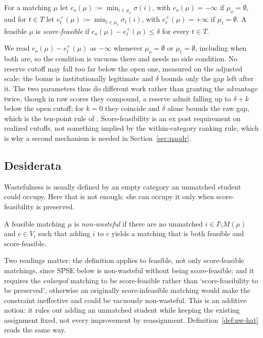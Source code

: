 \documentclass[runningheads]{llncs}
\begin{document}
\begin{definition}
\label{def:scorefeas}
For a matching $\mu$ let $e_o(\mu):=\min_{i\in\mu_o}\sigma(i)$, with $e_o(\mu)=-\infty$ if $\mu_o=\emptyset$, and for $t\in T$ let $e_t^+(\mu):=\min_{i\in\mu_t}\sigma_t(i)$, with $e_t^+(\mu)=+\infty$ if $\mu_t=\emptyset$. A feasible $\mu$ is \emph{score-feasible} if $e_o(\mu)-e_t^+(\mu)\le\delta$ for every $t\in T$.
\end{definition}

We read $e_o(\mu)-e_t^+(\mu)$ as $-\infty$ whenever $\mu_o=\emptyset$ or $\mu_t=\emptyset$, including when both are, so the condition is vacuous there and needs no side condition. No reserve cutoff may fall too far below the open one, measured on the adjusted scale: the bonus is institutionally legitimate and $\delta$ bounds only the gap left after it. The two parameters thus do different work rather than granting the advantage twice, though in raw scores they compound, a reserve admit falling up to $\delta+k$ below the open cutoff; for $k=0$ they coincide and $\delta$ alone bounds the raw gap, which is the ten-point rule of \cite{AyTu23b}. Score-feasibility is an ex post requirement on realized cutoffs, not something implied by the within-category ranking rule, which is why a second mechanism is needed in Section~\ref{sec:paodr}.

\subsection{Desiderata}

Wastefulness is usually defined by an empty category an unmatched student could occupy. Here that is not enough: she can occupy it only when score-feasibility is preserved.

\begin{definition}
\label{def:nw}
A feasible matching $\mu$ is \emph{non-wasteful} if there are no unmatched $i\in I\setminus M(\mu)$ and $c\in V_i$ such that adding $i$ to $c$ yields a matching that is both feasible and score-feasible.
\end{definition}

Two readings matter: the definition applies to feasible, not only score-feasible matchings, since SPSE below is non-wasteful without being score-feasible; and it requires the \emph{enlarged} matching to be score-feasible rather than `score-feasibility to be preserved', otherwise an originally score-infeasible matching would make the constraint ineffective and could be vacuously non-wasteful. This is an additive notion: it rules out adding an unmatched student while keeping the existing assignment fixed, not every improvement by reassignment. Definition~\ref{def:nw-hat} reads the same way.
\end{document}
